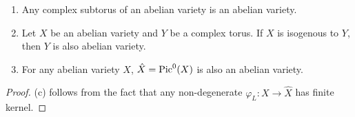 \begin{corollary}
\noindent
\begin{enumerate}
\item Any complex subtorus of an abelian variety is an abelian variety.
\item Let $X$ be an abelian variety and $Y$ be a complex torus. If $X$ is isogenous to $Y$, then $Y$ is also abelian variety. 
\item For any abelian variety $X$, $\hat{X}=\operatorname{Pic}^0(X)$ is also an abelian variety.
\end{enumerate}
\end{corollary}

\begin{proof}
(c) follows from the fact that any non-degenerate $\varphi_L:X\to \hat{X}$ has finite kernel.
\end{proof}

